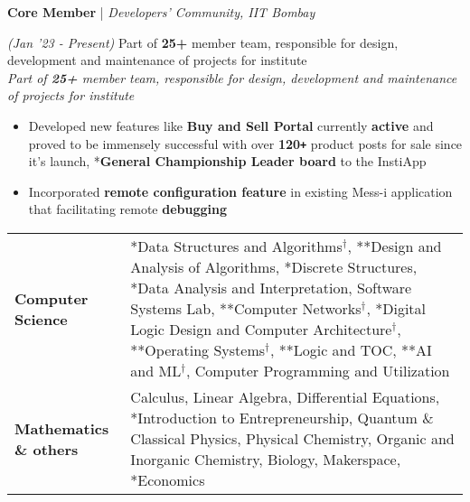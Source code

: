 \documentclass[10pt]{article}
\def\Plus{\texttt{\texttt{+}}}
\newcommand{\xfill}[2][1ex]{
	\dimen0=#2\advance\dimen0 by #1
	\leaders\hrule height \dimen0 depth -#1\hfill
}
\renewcommand{\section}[1]{
	\vspace{5pt}
	{\color{Blue}{\Large\scshape\raggedright #1\xfill[0pt]{0.5pt}}}
}
\renewcommand{\subsection}[4]{
	\def\temp{#4}
	\vspace{2pt}
	{
		\large
		{\textbf{#1}} | {\sl #2} \filldate{#3}
		\ifx\temp\empty
		\else
		{
			\\[0.1em]
			\fontsize{11}{13.2}\selectfont
			\sl #4
		}
		\fi
	}
}
\newcommand{\filldate}[1]{\strut\hfill {\small \textit{(#1)}}}
\begin{document}
\section{Positions Of Responsibilities}
\vspace{2pt}

\subsection{Core Member}{Developers' Community, IIT Bombay}{Jan '23 - Present}{Part of \textbf{25+} member team, responsible for design, development and maintenance of projects for institute}
\begin{itemize}
	\item Developed new features like \textbf{Buy and Sell Portal} currently \textbf{active} and proved to be immensely successful with over \textbf{120\Plus} product posts for sale since it's launch, *\textbf{General Championship Leader board} to the InstiApp 
	\item Incorporated \textbf{remote configuration feature} in existing Mess-i application that facilitating remote \textbf{debugging}

\end{itemize}


\vspace{-2pt}
\section{Key Courses Undertaken}
\vspace{2pt}

\begin{tabular}{p{4cm} p{13.5cm}}
	\vspace{-3pt}\textbf{Computer Science} & \vspace{-5pt}*Data Structures and Algorithms$^\dagger$, **Design and Analysis of Algorithms, *Discrete Structures, *Data Analysis and Interpretation, Software Systems Lab, **Computer Networks$^\dagger$, *Digital Logic Design and Computer Architecture$^\dagger$, **Operating Systems$^\dagger$, **Logic and TOC, **AI and ML$^\dagger$, Computer Programming and Utilization\\
        \vspace{-3pt}\textbf{Mathematics \& others} & \vspace{-5pt}Calculus, Linear Algebra, Differential Equations, *Introduction to Entrepreneurship, Quantum \& Classical Physics, Physical Chemistry, Organic and Inorganic Chemistry, Biology, Makerspace, *Economics
\end{tabular}
\vspace{0pt}
\end{document}
